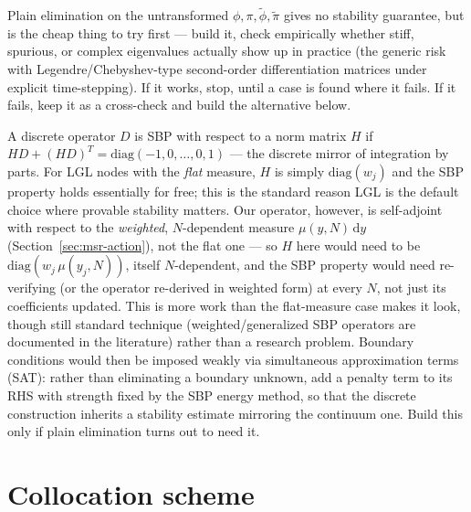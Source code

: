 \documentclass[a4paper,11pt]{article}
\newcommand{\semibold}[1]{{\fontseries{b}\selectfont{#1}}}
\renewcommand{\d}{\mathrm{d}}
\newenvironment{panel}{\begin{tcolorbox}[enhanced,breakable,colback=gray!10,colframe=gray!30]\small}{\end{tcolorbox}}
\newcommand{\Ny}{N}                          %
\newcommand{\field}{\phi}                    %
\newcommand{\mom}{\pi}                       %
\newcommand{\rfield}{\widetilde\field}       %
\newcommand{\rmom}{\widetilde\mom}           %
\newcommand{\yco}{y}                         %
\newcommand{\measure}{\mu}                   %
\begin{document}
\begin{panel}
\semibold{Numerical scheme: hard elimination first.} Plain elimination on
the untransformed $\field,\mom,\rfield,\rmom$ gives no stability
guarantee, but is the cheap thing to try first --- build it, check
empirically whether stiff, spurious, or complex eigenvalues actually show
up in practice (the generic risk with Legendre/Chebyshev-type second-order
differentiation matrices under explicit time-stepping). If it works,
stop, until a case is found where it fails. If it fails, keep it as a
cross-check and build the alternative below.
\end{panel}

\begin{panel}
\semibold{Alternative: weighted SBP with SAT boundary terms.} A discrete
operator $D$ is SBP with respect to a norm matrix $H$ if
$HD+(HD)^T=\mathrm{diag}(-1,0,\dots,0,1)$ --- the discrete mirror of
integration by parts. For LGL nodes with the \emph{flat} measure, $H$ is
simply $\mathrm{diag}(w_j)$ and the SBP property holds essentially for
free; this is the standard reason LGL is the default choice where
provable stability matters. Our operator, however, is self-adjoint with
respect to the \emph{weighted}, $\Ny$-dependent measure $\measure(\yco,\Ny)\,\d\yco$
(Section~\ref{sec:msr-action}), not the flat one --- so $H$ here would
need to be $\mathrm{diag}(w_j\,\measure(\yco_j,\Ny))$, itself
$\Ny$-dependent, and the SBP property would need re-verifying (or the
operator re-derived in weighted form) at every $\Ny$, not just its
coefficients updated. This is more work than the flat-measure case makes
it look, though still standard technique (weighted/generalized SBP
operators are documented in the literature) rather than a research
problem. Boundary conditions would then be imposed weakly via
simultaneous approximation terms (SAT): rather than eliminating a
boundary unknown, add a penalty term to its RHS with strength fixed by the
SBP energy method, so that the discrete construction inherits a stability
estimate mirroring the continuum one. Build this only if plain elimination
turns out to need it.
\end{panel}

\section{Collocation scheme}
\label{sec:collocation-scheme}
\end{document}
